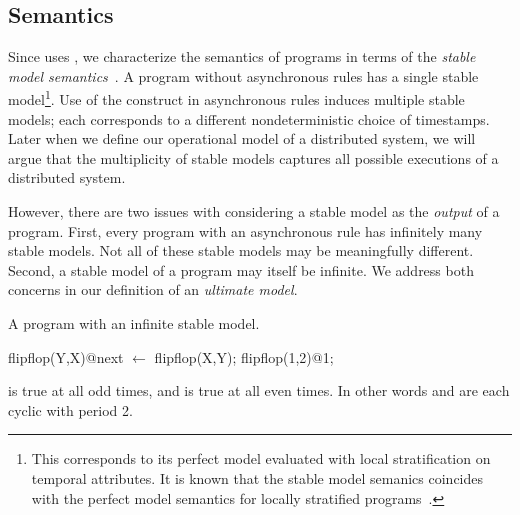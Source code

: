 %


\subsection{Semantics}
Since \lang uses , we characterize the semantics of \lang programs in terms of the {\em stable model semantics}~\cite{stable-model}.  A \lang program without asynchronous rules has a single stable model\footnote{This corresponds to its perfect model evaluated with local stratification on temporal attributes.  It is known that the stable model semanics coincides with the perfect model semantics for locally stratified programs~\cite{stable-model}.}.  Use of the  construct in asynchronous rules induces multiple stable models; each corresponds to a different nondeterministic choice of timestamps.  Later when we define our operational model of a distributed system, we will argue that the multiplicity of stable models captures all possible executions of a distributed system.

However, there are two issues with considering a stable model as the {\em output} of a \lang program.  First, every program with an asynchronous rule has infinitely many stable models.  Not all of these stable models may be meaningfully different.  Second, a stable model of a \lang program may itself be infinite.  We address both concerns in our definition of an {\em ultimate model}.

\begin{example}
\label{ex:flipflop}
A \lang program with an infinite stable model.

\begin{Dedalus}
flipflop(Y,X)@next \(\leftarrow\) flipflop(X,Y);
flipflop(1,2)@1;
\end{Dedalus}

 is true at all odd times, and  is true at all even times.  In other words  and  are each cyclic with period 2.
\end{example}

